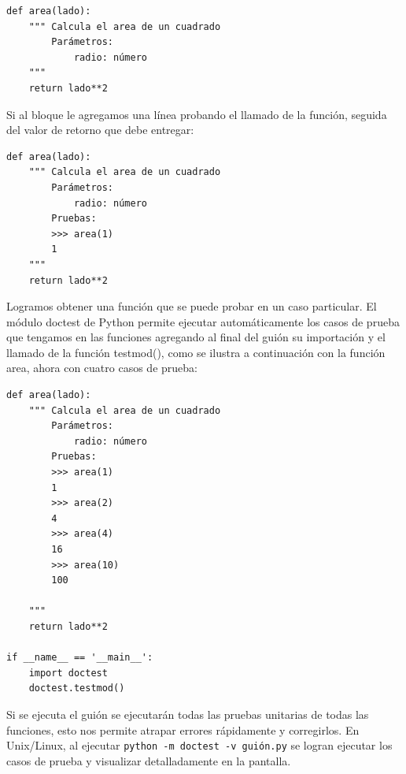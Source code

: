 \begin{verbatim}
def area(lado):
    """ Calcula el area de un cuadrado
        Parámetros:
            radio: número
    """
    return lado**2
\end{verbatim}
 

Si al bloque le agregamos una línea probando el llamado de la función,
seguida del valor de retorno que debe entregar:

\begin{verbatim}
def area(lado):
    """ Calcula el area de un cuadrado
        Parámetros:
            radio: número
        Pruebas:
        >>> area(1)
        1        
    """
    return lado**2
\end{verbatim}

Logramos obtener una función que se puede probar en un caso particular.
El módulo doctest de Python permite ejecutar automáticamente los casos
de prueba que tengamos en las funciones agregando al final del guión
su importación y el llamado de la función testmod(), como se ilustra
a continuación con la función area, ahora con cuatro casos de prueba:

\begin{verbatim}
def area(lado):
    """ Calcula el area de un cuadrado
        Parámetros:
            radio: número
        Pruebas:
        >>> area(1)
        1
        >>> area(2)
        4
        >>> area(4)
        16
        >>> area(10)
        100
        
    """
    return lado**2

if __name__ == '__main__':
    import doctest
    doctest.testmod()
\end{verbatim}

Si se ejecuta el guión se ejecutarán todas las pruebas unitarias de
todas las funciones, esto nos permite atrapar errores rápidamente
y corregirlos. En Unix/Linux, al ejecutar \verb+python -m doctest -v guión.py+
se logran ejecutar los casos de prueba y visualizar detalladamente
en la pantalla.

